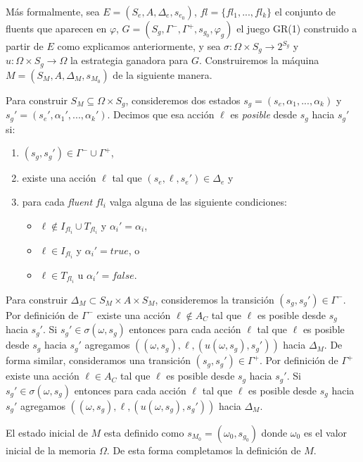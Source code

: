 Más formalmente, sea $E = (S_e,A,\Delta_e,s_{e_0})$, $fl = \{fl_1,...,fl_k\}$ el conjunto de fluents que aparecen en
$\varphi$, $G = (S_g,\Gamma^-,\Gamma^+,s_{g_0},\varphi_g)$ el juego GR(1) construido a partir de $E$ como explicamos
anteriormente, y sea $\sigma: \Omega \times S_g \rightarrow 2^{S_g}$ y $u: \Omega \times S_g \rightarrow \Omega$ la
estrategia ganadora para $G$. Construiremos la máquina $M = (S_M, A, \Delta_M, s_{M_0})$ de la siguiente manera.

Para construir $S_M \subseteq \Omega \times S_g$, consideremos dos estados $s_g = (s_e,\alpha_1,...,\alpha_k)$ y $s_g' =
(s_e',\alpha_1',...,\alpha_k')$. Decimos que esa acción $\ell$ es \emph{posible} desde $s_g$ hacia $s_g'$ si:

\begin{enumerate}
\itemsep-4mm
\item $(s_g,s_g') \in \Gamma^- \cup \Gamma^+$,
\item existe una acción $\ell$ tal que $(s_e,\ell,s_e') \in \Delta_e$ y
\item para cada \emph{fluent} $fl_i$ valga alguna de las siguiente condiciones:
\vspace{-4mm}
\begin{itemize}
    \itemsep-4mm
    \item $\ell \notin I_{fl_i} \cup T_{fl_i}$ y $\alpha_i' = \alpha_i$,
    \item $\ell \in I_{fl_i}$ y $\alpha_i'=true$, o
    \item $\ell \in T_{fl_i}$ u $\alpha_i'=false$.
\end{itemize}
\end{enumerate}

Para construir $\Delta_M \subset S_M \times A \times S_M$, consideremos la transición $(s_g,s_g') \in \Gamma^-$. Por
definición de $\Gamma^-$ existe una acción $\ell \notin A_C$ tal que $\ell$ es posible desde $s_g$ hacia $s_g'$. Si
$s_g' \in \sigma(\omega,s_g)$ entonces para cada acción $\ell$ tal que $\ell$ es posible desde $s_g$ hacia $s_g'$
agregamos $((\omega,s_g),\ell,(u(\omega,s_g),s_g'))$ hacia $\Delta_M$. De forma similar, consideramos una transición
$(s_g,s_g') \in \Gamma^+$. Por definición de $\Gamma^+$ existe una acción $\ell \in A_C$ tal que $\ell$ es posible desde
$s_g$ hacia $s_g'$. Si $s_g' \in \sigma(\omega,s_g)$ entonces para cada acción $\ell$ tal que $\ell$ es posible desde
$s_g$ hacia $s_g'$ agregamos $((\omega,s_g),\ell,(u(\omega,s_g),s_g'))$ hacia $\Delta_M$.

El estado inicial de $M$ esta definido como $s_{M_0} = (\omega_0,s_{g_0})$ donde $\omega_0$ es el valor inicial de la
memoria $\Omega$. De esta forma completamos la definición de $M$.

